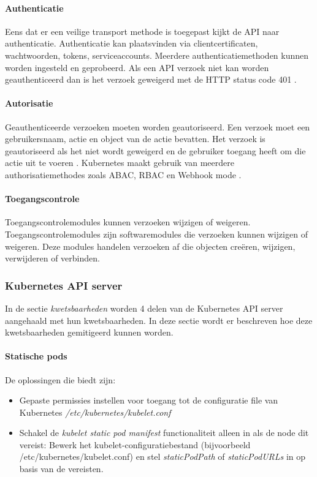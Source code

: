\paragraph{Authenticatie}
Eens dat er een veilige transport methode is toegepast kijkt de API naar authenticatie. Authenticatie kan plaatsvinden via clientcertificaten, wachtwoorden, tokens, serviceaccounts. Meerdere authenticatiemethoden kunnen worden ingesteld en geprobeerd.
Als een API verzoek niet kan worden geauthenticeerd dan is het verzoek geweigerd met de HTTP status code 401 \autocite{KubernetesDocs-2023}.  

\paragraph{Autorisatie}
Geauthenticeerde verzoeken moeten worden geautoriseerd. Een verzoek moet een gebruikersnaam, actie en object van de actie bevatten. Het verzoek is geautoriseerd als het niet wordt geweigerd en de gebruiker toegang heeft om die actie uit te voeren \autocite{KubernetesDocs-2023}.
Kubernetes maakt gebruik van meerdere authorisatiemethodes zoals ABAC, RBAC en Webhook mode \autocite{KubernetesDocs-2023}. 

\paragraph{Toegangscontrole}
Toegangscontrolemodules kunnen verzoeken wijzigen of weigeren. Toegangscontrolemodules zijn softwaremodules die verzoeken kunnen wijzigen of weigeren. Deze modules   handelen verzoeken af die objecten creëren, wijzigen, verwijderen of verbinden. 

\subsubsection{Kubernetes API server}
In de sectie \textit{kwetsbaarheden} worden 4 delen van de Kubernetes API server aangehaald met hun kwetsbaarheden. In deze sectie wordt er beschreven hoe deze kwetsbaarheden gemitigeerd kunnen worden.

\paragraph{Statische pods}
De oplossingen die \textcite{KubernetesDocs-2023} biedt zijn:
\begin{itemize}
    \item Gepaste permissies instellen voor toegang tot de configuratie file van Kubernetes \textit{/etc/kubernetes/kubelet.conf} 
    \item Schakel de \textit{kubelet static pod manifest} functionaliteit alleen in als de node dit vereist: Bewerk het kubelet-configuratiebestand (bijvoorbeeld /etc/kubernetes/kubelet.conf) en stel \textit{staticPodPath} of \textit{staticPodURLs} in op basis van de vereisten.
\end{itemize}

